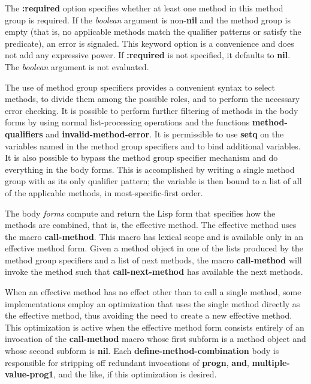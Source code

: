 \item{\bull}
The {\bf :required} option specifies whether at least one method in
this method group is required.  If the {\it boolean\/} argument is
non-{\bf nil} and the method group is empty (that is, no applicable
methods match the qualifier patterns or satisfy the predicate), an
error is signaled.  This keyword option is a convenience and does not
add any expressive power.  If {\bf :required} is not specified,
it defaults to {\bf nil}.  The {\it boolean\/} argument is not
evaluated.

\endlist

The use of method group specifiers provides a convenient syntax to
select methods, to divide them among the possible roles, and to perform the
necessary error checking.  It is possible to perform further filtering
of methods in the body forms by using normal list-processing operations
and the functions {\bf method-qualifiers} and {\bf
invalid-method-error}.  It is permissible to use {\bf setq} on the
variables named in the method group specifiers and to bind additional
variables.  It is also possible to bypass the method group specifier
mechanism and do everything in the body forms.  This is accomplished
by writing a single method group with {\bf *} as its only qualifier
pattern; the variable is then bound to a list of all of the applicable
methods, in most-specific-first order.

The body {\it forms\/} compute and return the Lisp form that specifies
how the methods are combined, that is, the effective method.  The
effective method uses the macro {\bf call-method}.  This macro has
lexical scope and is available only in an effective method form.
Given a method object in one of the lists produced by the method group
specifiers and a list of next methods, the macro {\bf call-method}
will invoke the method such that {\bf call-next-method} has available
the next methods.

When an effective method has no effect other than to call a single
method, some implementations employ an optimization that uses the
single method directly as the effective method, thus avoiding the need
to create a new effective method.  This optimization is active when
the effective method form consists entirely of an invocation of
the {\bf call-method} macro whose first subform is a method object and
whose second subform is {\bf nil}.  Each {\bf
define-method-combination} body is responsible for stripping off
redundant invocations of {\bf progn}, {\bf and}, {\bf
multiple-value-prog1}, and the like, if this optimization is desired.

